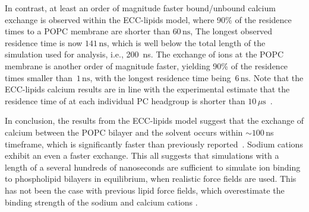 \documentclass[aip,jcp,twocolumn]{revtex4}
\begin{document}
In contrast, at least an order of magnitude faster bound/unbound calcium exchange is observed within the
ECC-lipids model, where 90\% of the  residence times to a POPC membrane are 
shorter than $60\,\mathrm{ns}$, %
The longest observed residence time is now $141\,\mathrm{ns}$, 
which is well below the total length of the simulation used for analysis, i.e., 200~ns.
The exchange of  ions at the POPC membrane is
another order of magnitude faster, yielding 90\%
of the residence times smaller than~$1\,\mathrm{ns}$, with
the longest residence time being~$6\,\mathrm{ns}$. 
Note that the ECC-lipids calcium results are in line with the experimental estimate that 
the residence time of  at each individual PC headgroup 
is shorter than $10\,\mu\mathrm{s}$~\cite{altenbach84}.


In conclusion, the results from the ECC-lipids model suggest that the
exchange of calcium between the POPC bilayer and the solvent occurs within $\sim 100\,$ns timeframe,
which is significantly faster than previously reported~\cite{javanainen17}.
Sodium cations exhibit an even a faster exchange.
This all suggests that simulations with a length of a several hundreds of
nanoseconds are sufficient to simulate ion binding
to phospholipid bilayers in equilibrium, when realistic force fields are used.
This has not been the case with previous lipid force fields,
which overestimate the binding strength of the sodium and calcium cations \cite{javanainen17,catte16}.
\end{document}
